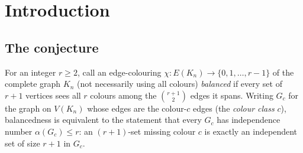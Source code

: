 \documentclass[11pt,reqno]{amsart}
\theoremstyle{definition}
\theoremstyle{remark}
\begin{document}
\begin{abstract}
Both proofs are formalised in Lean~4 against the same
\texttt{google\-deepmind/formal-conjectures} statement of the problem at $r=5$, and a
kernel-checked equivalence proves the two formalised statements are the \emph{same}
theorem. Each proof was subjected to independent adversarial review by the other
effort; both survived with no fatal finding. This is a \emph{candidate}, not a
community-accepted result: the mathematics of both proofs was produced and internally
reviewed by AI systems and has not been refereed by a human expert. Neither proof
rests on an unformalised mathematical hypothesis; each carries a disclosed trust base
(Proof~A: three standard Lean axioms plus four \texttt{native\_decide} reflection axioms
for its SAT certificates --- a migration this round moved its ten finite construction
facts to kernel checking, leaving these four; Proof~B: the three standard axioms with SAT
discharged through Mathlib's kernel-checked \texttt{lrat\_proof}). Section~\ref{sec:howto} is a verification guide;
Section~\ref{sec:provenance} and Appendix~\ref{app:methodology} disclose provenance
and the full cross-verification trail. Every section of Proof~B is marked pending an
accuracy pass by its authors.
\end{abstract}

\maketitle

\setcounter{tocdepth}{1}

\section{Introduction}

\subsection{The conjecture}
For an integer $r\ge 2$, call an edge-colouring
$\chi\colon E(K_n)\to\{0,1,\dots,r-1\}$ of the complete graph $K_n$
(not necessarily using all colours) \emph{balanced} if every set of $r+1$
vertices sees all $r$ colours among the $\binom{r+1}{2}$ edges it spans. Writing
$G_c$ for the graph on $V(K_n)$ whose edges are the colour-$c$ edges (the
\emph{colour class} $c$), balancedness is equivalent to the statement that every
$G_c$ has independence number $\alpha(G_c)\le r$: an $(r+1)$-set missing colour
$c$ is exactly an independent set of size $r+1$ in $G_c$.
\end{document}
